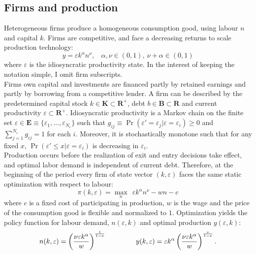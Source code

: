 \documentclass[12pt]{article}
\begin{document}
\subsection{Firms and production \label{sec:production}}
Heterogeneous firms produce a homogeneous consumption good, using labour $n$ and capital $k$. Firms are competitive, and face a decreasing returns to scale production technology:
\begin{equation} \label{eq:prodf}
y = \varepsilon k^{\alpha}n^{\nu}, \ \ \ \ \alpha,\nu \in (0,1),  \ \nu + \alpha \in (0,1)
\end{equation}  
where $\varepsilon$ is the idiosyncratic productivity state. In the interest of keeping the notation simple, I omit firm subscripts. \vspace{3mm} \\
Firms own capital and investments are financed partly by retained earnings and partly by borrowing from a competitive lender. A firm can be described by the predetermined capital stock $k \in \mathbf{K} \subset \mathbf{R^{+}}$, debt $b \in \mathbf{B} \subset \mathbf{R}$ and current productivity $\varepsilon \subset \mathbf{R^+}$. Idiosyncratic productivity is a Markov chain on the finite set $\varepsilon \in \mathbf{E} \equiv \{ \varepsilon_1,...,\varepsilon_{N_{\varepsilon}} \}$ such that $ g_{ij} \equiv \Pr(\varepsilon'= \varepsilon_j|\varepsilon = \varepsilon_i) \geq 0$ and $\sum_{j=1}^{N_{\varepsilon}} g_{ij} = 1$ for each $i$. Moreover, it is stochastically monotone such that for any fixed $x$, $\Pr(\varepsilon' \leq x | \varepsilon = \varepsilon_i)$ is decreasing in $\varepsilon_i$. \vspace{3mm} \\
Production occurs before the realization of exit and entry decisions take effect, and optimal labor demand is independent of current debt. Therefore, at the beginning of the period every firm of state vector $(k,\varepsilon)$ faces the same static optimization with respect to labour: 
$$ \pi(k,\varepsilon) = \max_{n} \ \  \varepsilon k^{\alpha}n^{\nu} - wn - c$$
where $c$ is a fixed cost of participating in production, $w$ is the wage and the price of the consumption good is flexible and normalized to $1$. Optimization yields the policy function for labour demand, $n(\varepsilon,k)$ and optimal production $y(\varepsilon,k)$: 
\begin{equation} \label{eq:opt_emp_prod}
n(k,\varepsilon) = \left( \dfrac{ \nu \varepsilon k^\alpha}{w} \right)^{\frac{1}{1-\nu}} \hspace{15mm}
y(k,\varepsilon) = \varepsilon k^{\alpha} \left( \dfrac{\nu \varepsilon k^\alpha}{w} \right)^{\frac{\nu}{1-\nu}}.
\end{equation}  
\end{document}
